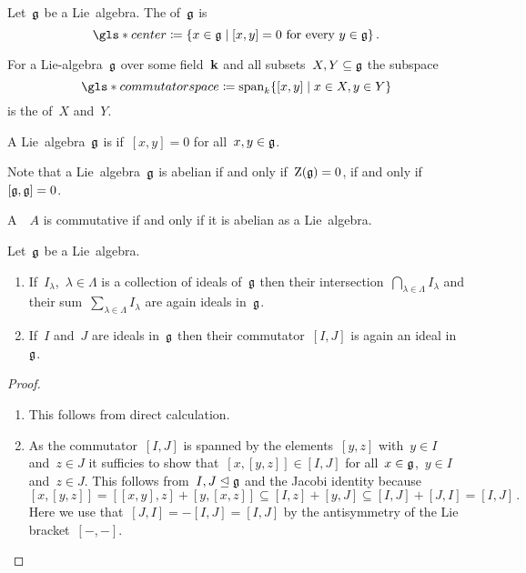 \begin{definition}
  Let~$\mathfrak{g}$ be a Lie~algebra.
  The  of~$\mathfrak{g}$ is
  \[
    \gls*{center}
    \defined
    \{
      x \in \glie
    \suchthat
      \text{$[x,y] = 0$ for every~$y \in \glie$}
    \}  \,.
  \]
\end{definition}


\begin{definition}
  For a Lie-algebra~$\mathfrak{g}$ over some field~$\kf$ and all subsets~$X, Y \subseteq \mathfrak{g}$ the subspace
  \[
    \gls*{commutator space}
    \defined
    \vspan_k
    \{
      [x,y]
    \suchthat
      x \in X,
      y \in Y
    \}
  \]
  is the  of~$X$ and~$Y$.
\end{definition}


\begin{definition}
  A Lie~algebra~$\mathfrak{g}$ is  if~$[x,y] = 0$ for all~$x, y \in \mathfrak{g}$.
\end{definition}


\begin{remark}
  Note that a Lie~algebra~$\mathfrak{g}$ is abelian if and only if~$\operatorname{Z}(\mathfrak{g}) = 0$, if and only if~$[\mathfrak{g}, \mathfrak{g}] = 0$.
\end{remark}


\begin{example}
  A~{\algebra{$\kf$}}~$A$ is commutative if and only if it is abelian as a Lie~algebra.
\end{example}


\begin{lemma}
  Let~$\mathfrak{g}$ be a Lie~algebra.
  \begin{enumerate}
    \item
    If~$I_\lambda$,~$\lambda \in \Lambda$ is a collection of ideals of~$\mathfrak{g}$ then their intersection~$\bigcap_{\lambda \in \Lambda} I_\lambda$ and their sum~$\sum_{\lambda \in \Lambda} I_\lambda$ are again ideals in~$\mathfrak{g}$.
    \item
    If~$I$ and~$J$ are ideals in~$\mathfrak{g}$ then their commutator~$[I,J]$ is again an ideal in~$\mathfrak{g}$.
  \end{enumerate}
\end{lemma}


\begin{proof}
  \leavevmode
  \begin{enumerate}
    \item
      This follows from direct calculation.
    \item
      As the commutator~$[I,J]$ is spanned by the elements~$[y,z]$ with~$y \in I$ and~$z \in J$ it sufficies to show that~$[x,[y,z]] \in [I,J]$ for all~$x \in \mathfrak{g}$,~$y \in I$ and~$z \in J$.
      This follows from~$I, J \trianglelefteq \mathfrak{g}$ and the Jacobi identity because
      \[
        [x,[y,z]]
        =
        [[x,y], z] + [y, [x,z]]
        \subseteq
        [I, z] + [y, J]
        \subseteq
        [I, J] + [J, I]
        =
        [I,J] \,.
      \]
      Here we use that~$[J,I] = -[I,J] = [I,J]$ by the antisymmetry of the Lie bracket~$[-,-]$.
   \qedhere
 \end{enumerate}
\end{proof}


